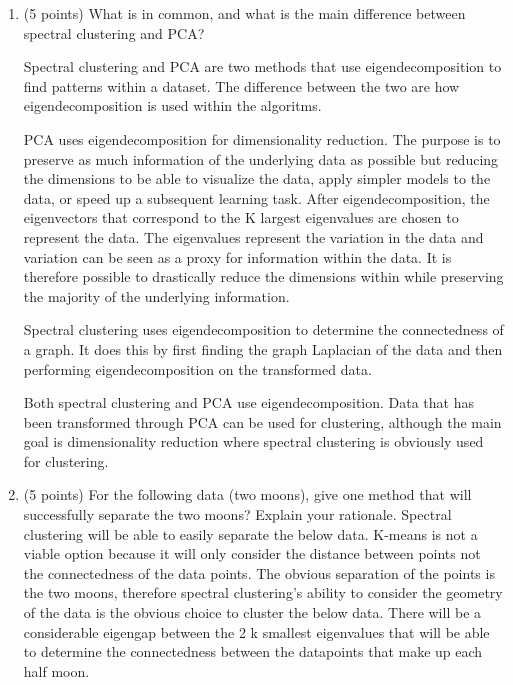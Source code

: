 \documentclass[a4paper,12pt,fleqn]{article}
\begin{document}
\begin{enumerate}
\item (5 points) What is in common, and what is the main difference between spectral clustering and PCA?

\vspace{.15in}
Spectral clustering and PCA are two methods that use eigendecomposition to find patterns within a dataset.  The difference between the two are how eigendecomposition is used within the algoritms.  

PCA uses eigendecomposition for dimensionality reduction.  The purpose is to preserve as much information of the underlying data as possible but reducing the dimensions to be able to visualize the data, apply simpler models to the data, or speed up a subsequent learning task.  After eigendecomposition, the eigenvectors that correspond to the K largest eigenvalues are chosen to represent the data.  The eigenvalues represent the variation in the data and variation can be seen as a proxy for information within the data.  It is therefore possible to drastically reduce the dimensions within while preserving the majority of the underlying information.  

Spectral clustering uses eigendecomposition to determine the connectedness of a graph.  It does this by  first finding the graph Laplacian of the data and then performing eigendecomposition on the transformed data.  

Both spectral clustering and PCA use eigendecomposition.  Data that has been transformed through PCA can be used for clustering, although the main goal is dimensionality reduction where spectral clustering is obviously used for clustering.

\vspace{.15in}

\item (5 points) For the following data (two moons), give one method that will successfully separate the two moons? Explain your rationale. 
\vspace{.15in}
Spectral clustering will be able to easily separate the below data.  K-means is not a viable option because it will only consider the distance between points not the connectedness of the data points.  The obvious separation of the points is the two moons, therefore spectral clustering's ability to consider the geometry of the data is the obvious choice to cluster the below data.  There will be a considerable eigengap between the 2 k smallest eigenvalues that will be able to determine the connectedness between the datapoints that make up each half moon.


\end{enumerate}
\end{document}
